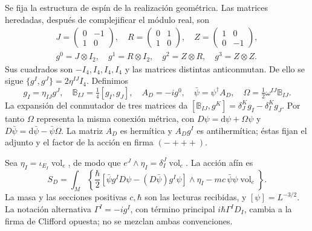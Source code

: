 Se fija la estructura de espín de la realización geométrica. Las
matrices heredadas, después de complejificar el módulo real, son
\begin{equation}
 \begin{gathered}
 J=\begin{pmatrix}0&-1\\1&0\end{pmatrix},\quad
 R=\begin{pmatrix}0&1\\1&0\end{pmatrix},\quad
 Z=\begin{pmatrix}1&0\\0&-1\end{pmatrix},\\
 g^0=J\otimes I_2,\quad g^1=R\otimes I_2,\quad
 g^2=Z\otimes R,\quad g^3=Z\otimes Z .
 \end{gathered}
 \label{hmtcuatro:ant:clifford}
\end{equation}
Sus cuadrados son \(-I_4,I_4,I_4,I_4\) y las matrices
distintas anticonmutan. De ello se sigue
\(\{g^I,g^J\}=2\eta^{IJ}I_4\). Definimos
\[
 g_I=\eta_{IJ}g^J,\quad
 \mathbb B_{IJ}=\tfrac14[g_I,g_J],\quad
 A_D=-ig^0,\quad \bar\psi=\psi^\dagger A_D,\quad
 \Omega=\tfrac12\omega^{IJ}\mathbb B_{IJ}.
\]
La expansión del conmutador de tres matrices da
\([\mathbb B_{IJ},g^K]=\delta_J^Kg_I-\delta_I^Kg_J\).
Por tanto \(\Omega\) representa la misma conexión métrica, con
\(D\psi=\mathrm d\psi+\Omega\psi\) y
\(D\bar\psi=\mathrm d\bar\psi-\bar\psi\Omega\).
La matriz \(A_D\) es hermítica y \(A_Dg^I\) es antihermítica;
éstas fijan el adjunto y el factor de la acción en firma \((-+++)\).

Sea \(\eta_I=\iota_{E_I}\operatorname{vol}_e\), de modo que
\(e^J\wedge\eta_I=\delta_I^J\operatorname{vol}_e\). La acción afín es
\begin{equation}
 S_D=\int_M\left\{
 \frac{\hbar}{2}
 [\bar\psi g^ID\psi-(D\bar\psi)g^I\psi]\wedge\eta_I
 -mc\,\bar\psi\psi\operatorname{vol}_e\right\}.
 \label{hmtcuatro:ant:accion-dirac}
\end{equation}
La masa y las secciones positivas \(c,\hbar\) son las lecturas
recibidas, y \([\psi]=L^{-3/2}\). La notación alternativa
\(\Gamma^I=-ig^I\), con término principal
\(i\hbar\Gamma^ID_I\), cambia a la firma de Clifford opuesta;
no se mezclan ambas convenciones.

